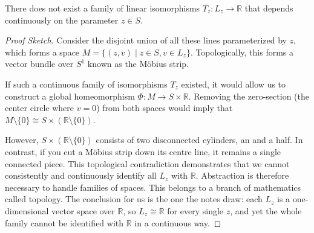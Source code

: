 \begin{center}
\end{center}

\begin{proposition}
  \label{prop:mobius_nontrivial}
  There does not exist a family of linear isomorphisms $T_z \colon L_z \to \mathbb{R}$ that depends continuously on the parameter $z \in S$.
\end{proposition}

\begin{proof}[Proof Sketch]
  Consider the disjoint union of all these lines parameterized by $z$, which forms a space $M = \{ (z, v) \mid z \in S, v \in L_z \}$. Topologically, this forms a vector bundle over $S^1$ known as the Möbius strip.

  If such a continuous family of isomorphisms $T_z$ existed, it would allow us to construct a global homeomorphism $\Phi \colon M \to S \times \mathbb{R}$. Removing the zero-section (the center circle where $v=0$) from both spaces would imply that $M \setminus \{0\} \cong S \times (\mathbb{R} \setminus \{0\})$.

  However, $S \times (\mathbb{R} \setminus \{0\})$ consists of two disconnected cylinders, an  and a  half. In contrast, if you cut a Möbius strip down its centre line, it remains a single connected piece. This topological contradiction demonstrates that we cannot consistently and continuously identify all $L_z$ with $\mathbb{R}$. Abstraction is therefore necessary to handle  families of spaces.
  This belongs to a branch of mathematics called topology. The conclusion for us is the one the notes draw: each $L_z$ is a one-dimensional vector space over $\mathbb{R}$, so $L_z \cong \mathbb{R}$ for every single $z$, and yet the whole family cannot be identified with $\mathbb{R}$ in a continuous way.
\end{proof}

